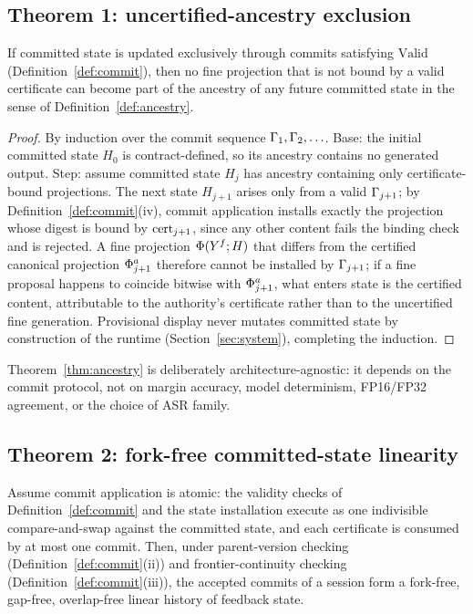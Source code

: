 \subsection{Theorem 1: uncertified-ancestry exclusion}\label{sec:dgft:thm1}

\begin{theorem}\label{thm:ancestry}
If committed state is updated exclusively through commits satisfying
$\mathrm{Valid}$ (Definition~\ref{def:commit}), then no fine projection
that is not bound by a valid certificate can become part of the ancestry of
any future committed state in the sense of Definition~\ref{def:ancestry}.
\end{theorem}

\begin{proof}
By induction over the commit sequence $\Gamma_1,\Gamma_2,\ldots$.
Base: the initial committed state $H_0$ is contract-defined, so its
ancestry contains no generated output. Step: assume committed state $H_j$
has ancestry containing only certificate-bound projections. The next state
$H_{j+1}$ arises only from a valid $\Gamma_{j+1}$; by
Definition~\ref{def:commit}(iv), commit application installs exactly the
projection whose digest is bound by $\mathrm{cert}_{j+1}$, since any other content
fails the binding check and is rejected. A fine projection
$\Phi(Y^{f};H)$ that differs from the certified canonical projection
$\Phi_{j+1}^{a}$ therefore cannot be installed by $\Gamma_{j+1}$; if a
fine proposal happens to coincide bitwise with $\Phi_{j+1}^{a}$, what
enters state is the certified content, attributable to the authority's
certificate rather than to the uncertified fine generation. Provisional
display never mutates committed state by construction of the runtime
(Section~\ref{sec:system}), completing the induction.
\end{proof}

Theorem~\ref{thm:ancestry} is deliberately architecture-agnostic: it depends
on the commit protocol, not on margin accuracy, model determinism,
FP16/FP32 agreement, or the choice of ASR family.

\subsection{Theorem 2: fork-free committed-state linearity}\label{sec:dgft:thm2}

\begin{theorem}\label{thm:linear}
Assume commit application is atomic: the validity checks of
Definition~\ref{def:commit} and the state installation execute as one
indivisible compare-and-swap against the committed state, and each
certificate is consumed by at most one commit. Then, under parent-version
checking (Definition~\ref{def:commit}(ii)) and frontier-continuity checking
(Definition~\ref{def:commit}(iii)), the accepted commits of a session form
a fork-free, gap-free, overlap-free linear history of feedback state.
\end{theorem}

